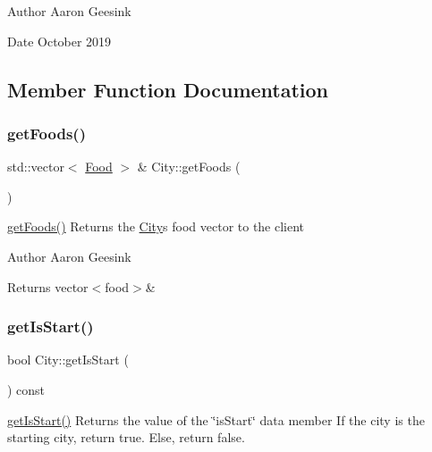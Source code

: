 \begin{DoxyAuthor}{Author}
Aaron Geesink 
\end{DoxyAuthor}
\begin{DoxyDate}{Date}
October 2019 
\end{DoxyDate}


\subsection{Member Function Documentation}
\mbox{\label{class_city_a16bcefb0db18d8692df25626542524f9}} 
\subsubsection{\texorpdfstring{getFoods()}{getFoods()}}
{\footnotesize\ttfamily std\+::vector$<$ \mbox{\hyperlink{class_food}{Food}} $>$ \& City\+::get\+Foods (\begin{DoxyParamCaption}{ }\end{DoxyParamCaption})}



\mbox{\hyperlink{class_city_a16bcefb0db18d8692df25626542524f9}{get\+Foods()}} Returns the \mbox{\hyperlink{class_city}{City}}\textquotesingle{}s food vector to the client 

\begin{DoxyAuthor}{Author}
Aaron Geesink 
\end{DoxyAuthor}
\begin{DoxyReturn}{Returns}
vector$<$food$>$\& 
\end{DoxyReturn}
\mbox{\label{class_city_ae817fa08cc2191da09c91c3d6b4069d5}} 
\subsubsection{\texorpdfstring{getIsStart()}{getIsStart()}}
{\footnotesize\ttfamily bool City\+::get\+Is\+Start (\begin{DoxyParamCaption}{ }\end{DoxyParamCaption}) const}



\mbox{\hyperlink{class_city_ae817fa08cc2191da09c91c3d6b4069d5}{get\+Is\+Start()}} Returns the value of the \char`\"{}is\+Start\char`\"{} data member If the city is the starting city, return true. Else, return false. 

